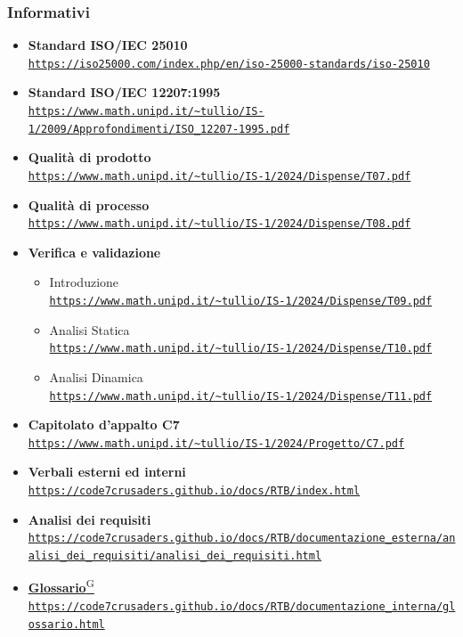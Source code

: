 \documentclass{article}
\begin{document}
\subsubsection{Informativi}
\begin{itemize}
    \item \textbf{Standard ISO/IEC 25010} \\ \texttt{\url{https://iso25000.com/index.php/en/iso-25000-standards/iso-25010}}
    \item \textbf{Standard ISO/IEC 12207:1995} \\ \texttt{\url{https://www.math.unipd.it/~tullio/IS-1/2009/Approfondimenti/ISO_12207-1995.pdf}}
    \item \textbf{Qualità di prodotto} \\ \texttt{\url{https://www.math.unipd.it/~tullio/IS-1/2024/Dispense/T07.pdf}}
    \item \textbf{Qualità di processo} \\ \texttt{\url{https://www.math.unipd.it/~tullio/IS-1/2024/Dispense/T08.pdf}}
    \item \textbf{Verifica e validazione}
    \begin{itemize}
        \item Introduzione \\ \texttt{\url{https://www.math.unipd.it/~tullio/IS-1/2024/Dispense/T09.pdf}}
        \item Analisi Statica \\ \texttt{\url{https://www.math.unipd.it/~tullio/IS-1/2024/Dispense/T10.pdf}}
        \item Analisi Dinamica \\ \texttt{\url{https://www.math.unipd.it/~tullio/IS-1/2024/Dispense/T11.pdf}}
    \end{itemize}
    \item \textbf{Capitolato d'appalto C7} \\ \texttt{\url{https://www.math.unipd.it/~tullio/IS-1/2024/Progetto/C7.pdf}}
    \item \textbf{Verbali esterni ed interni} \\ \texttt{\url{https://code7crusaders.github.io/docs/RTB/index.html}}
    \item \textbf{Analisi dei requisiti} \\ \texttt{\url{https://code7crusaders.github.io/docs/RTB/documentazione_esterna/analisi_dei_requisiti/analisi_dei_requisiti.html}}
    \item \href{https://code7crusaders.github.io/docs/RTB/documentazione_interna/glossario.html#glossario}{\textbf{Glossario}\textsuperscript{G}} \\ \texttt{\url{https://code7crusaders.github.io/docs/RTB/documentazione_interna/glossario.html}}
\end{itemize}
\newpage
\end{document}
